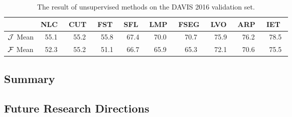 \begin{table*}[t!h]
	\begin{center}
		\begin{tabular}{|c|c|c|c|c|c|c|c|c|c|}
			\hline
			&NLC~\cite{Faktor2014Video} &CUT~\cite{Keuper2015Motion} &FST~\cite{Papazoglou2013Fast} &SFL~\cite{Cheng2017SegFlow:} &LMP~\cite{Tokmakov2017Learninga} &FSEG~\cite{Jain2017FusionSeg:} &LVO~\cite{Tokmakov2017Learning} & ARP~\cite{Koh2017Primary} 
			&IET~\cite{Li2018Instance} \\
			\hline
			$\mathcal{J}$ Mean &55.1 &55.2	&55.8 &67.4 & 70.0 & 70.7 &75.9 &76.2 &78.5 \\
			\hline
			$\mathcal{F}$ Mean &52.3 &55.2 &51.1 &66.7 &65.9 &65.3 &72.1 &70.6 &75.5 \\
			\hline
		\end{tabular}
	\end{center}
	\caption{The result of unsupervised methods on the DAVIS 2016 validation set.}
	\label{table:davis_unsuperivsed}
\end{table*}

\subsection{Summary}

\subsection{Future Research Directions}